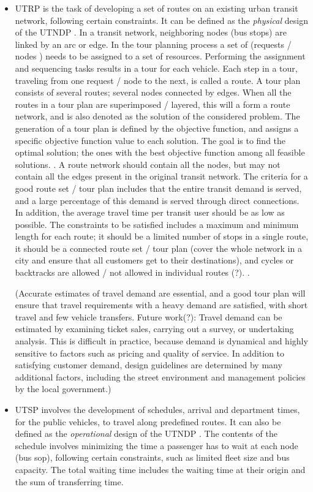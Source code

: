 \begin{itemize}
\item UTRP is the task of developing a set of routes on an existing urban transit network, following certain constraints. It can be defined as the \textit{physical} design of the UTNDP \citep{fan09}. 
In a transit network, neighboring nodes (bus stops) are linked by an arc or edge. In the tour planning process a set of (requests / nodes ) needs to be assigned to a set of resources. Performing the assignment and sequencing tasks results in a tour for each vehicle. Each step in a tour, traveling from one request / node to the next, is called a route. A tour plan consists of several routes; several nodes connected by edges. When all the routes in a tour plan are superimposed / layered, this will a form a route network, and is also denoted as the solution of the considered problem. The generation of a tour plan is defined by the objective function, and assigns a specific objective function value to each solution. The goal is to find the optimal solution; the ones with the best objective function among all feasible solutions. \citep{vehiclerouting}. A route network should contain all the nodes, but may not contain all the edges present in the original transit network. The criteria for a good route set / tour plan includes that the entire transit demand is served, and a large percentage of this demand is served through direct connections. In addition, the average travel time per transit user should be as low as possible. The constraints to be satisfied includes a maximum and minimum length for each route; it should be a limited number of stops in a single route, it should be a connected route set / tour plan (cover the whole network in a city and ensure that all customers get to their destinations), and cycles or backtracks are allowed / not allowed in individual routes (?). \citep{fan09}.

(Accurate estimates of travel demand are essential, and a good tour plan will ensure that travel requirements with a heavy demand are satisfied, with short travel and few vehicle transfers. Future work(?): Travel demand can be estimated by examining ticket sales, carrying out a survey, or undertaking analysis. This is difficult in practice, because demand is dynamical and highly sensitive to factors such as pricing and quality of service. In addition to satisfying customer demand, design guidelines are determined by many additional factors, including the street environment and management policies by the local government.)

\item UTSP involves the development of schedules, arrival and department times, for the public vehicles, to travel along predefined routes. It can also be defined as the \textit{operational} design of the UTNDP \citep{fan09}. 
The contents of the schedule involves minimizing the time a passenger has to wait at each node (bus sop), following certain constraints, such as limited fleet size and bus capacity.  The total waiting time includes the waiting time at their origin and the sum of transferring time. 

\end{itemize}


